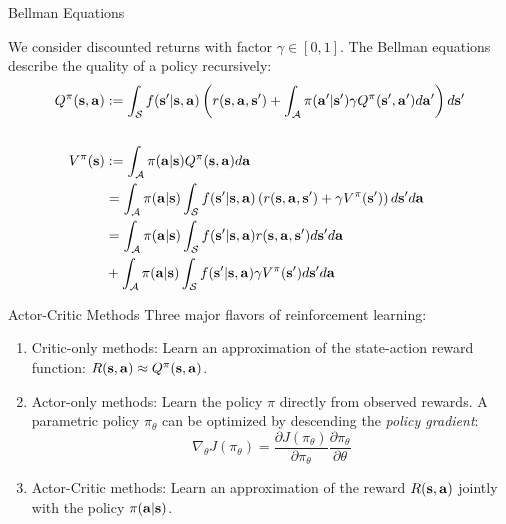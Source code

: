 \documentclass[]{beamer}
\begin{document}
\begin{frame}{Bellman Equations}

We consider discounted returns with factor $\gamma \in [0,1]$. The Bellman equations describe the quality of a policy recursively:
\begin{align*}
    Q^\pi(\vs, \va) &:= \int_\cS f(\vs' | \vs, \va)\left(r(\vs, \va, \vs') + \int_\cA \pi(\va' | \vs') \gamma Q^\pi(\vs', \va') d\va' \right) d\vs'\\\\
    V^\pi(\vs) &:= \int_\cA \pi(\va | \vs) Q^\pi(\vs, \va) d\va\\
    &= \int_\cA \pi(\va | \vs) \int_\cS f(\vs' | \vs, \va)\left(r(\vs, \va, \vs') + \gamma V^\pi(\vs')\right) d\vs' d\va\\
    &= \int_\cA \pi(\va | \vs) \int_\cS f(\vs' | \vs, \va)r(\vs, \va, \vs') d\vs'd\va \ \\
    & + \int_\cA \pi(\va | \vs) \int_\cS f(\vs' | \vs, \va) \gamma V^\pi(\vs') d\vs' d\va\\
\end{align*}

\end{frame}

\begin{frame}{Actor-Critic Methods}
    Three major flavors of reinforcement learning:
    \begin{enumerate}
        \item Critic-only methods: Learn an approximation of the state-action reward function: $R(\vs, \va) \approx Q^\pi(\vs,\va)$.
        \item Actor-only methods: Learn the policy $\pi$ directly from observed rewards. A parametric policy $\pi_\theta$ can be optimized by descending the \textit{policy gradient}:
        \[ \nabla_\theta J(\pi_\theta) = \frac{\partial J(\pi_\theta)}{\partial \pi_\theta} \frac{\partial \pi_\theta}{\partial \theta} \]
        \item Actor-Critic methods: Learn an approximation of the reward $R(\vs,\va)$ jointly with the policy $\pi(\va | \vs)$.
    \end{enumerate}
\end{frame}
\end{document}
